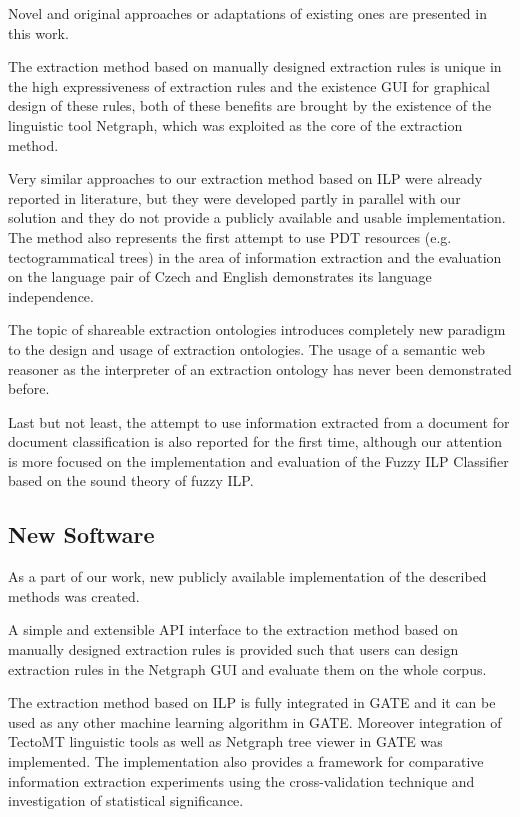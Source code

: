 Novel and original approaches or adaptations of existing ones are presented in this work.

The extraction method based on manually designed extraction rules is unique in the high expressiveness of extraction rules and the existence GUI for graphical design of these rules, both of these benefits are brought by the existence of the linguistic tool Netgraph, which was exploited as the core of the extraction method.

Very similar approaches to our extraction method based on ILP were already reported in literature, but they were developed partly in parallel with our solution and they do not provide a publicly available and usable implementation. The method also represents the first attempt to use PDT resources (e.g. tectogrammatical trees) in the area of information extraction and the evaluation on the language pair of Czech and English demonstrates its language independence.

The topic of shareable extraction ontologies introduces completely new paradigm to the design and usage of extraction ontologies. The usage of a semantic web reasoner as the interpreter of an extraction ontology has never been demonstrated before.

Last but not least, the attempt to use information extracted from a document for document classification is also reported for the first time, although our attention is more focused on the implementation and evaluation of the Fuzzy ILP Classifier based on the sound theory of fuzzy ILP.



\subsection{New Software}

As a part of our work, new publicly available implementation of the described methods was created. 

A simple and extensible API interface to the extraction method based on manually designed extraction rules is provided such that users can design extraction rules in the Netgraph GUI and evaluate them on the whole corpus. 

The extraction method based on ILP is fully integrated in GATE and it can be used as any other machine learning algorithm in GATE. Moreover integration of TectoMT linguistic tools as well as Netgraph tree viewer in GATE was implemented. The implementation also provides a framework for  comparative information extraction experiments using the cross-validation technique and investigation of statistical significance. 

